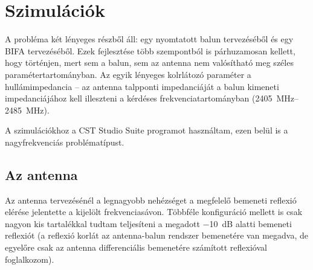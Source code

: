 \chapter{Szimulációk}
A probléma két lényeges részből áll: egy nyomtatott balun tervezéséből és egy BIFA tervezéséből. Ezek fejlesztése több szempontból is párhuzamosan kellett, hogy történjen, mert sem a balun, sem az antenna nem valósítható meg széles paramétertartományban. Az egyik lényeges kolrlátozó paraméter a hullámimpedancia -- az antenna talpponti impedanciáját a balun kimeneti impedanciájához kell illeszteni a kérdéses frekvenciatartományban (\SIrange{2405}{2485}{MHz}).
\par A szimulációkhoz a CST Studio Suite programot használtam, ezen belül is a nagyfrekvenciás problématípust.
\section{Az antenna}
	Az antenna tervezésénél a legnagyobb nehézséget a megfelelő bemeneti reflexió elérése jelentette a kijelölt frekvenciasávon. Többféle konfiguráció mellett is csak nagyon kis tartalékkal tudtam teljesíteni a megadott \SI{-10}{dB} alatti bemeneti reflexiót (a reflexió korlát az antenna-balun rendszer bemenetére van megadva, de egyelőre csak az antenna differenciális bemenetére számított reflexióval foglalkozom).